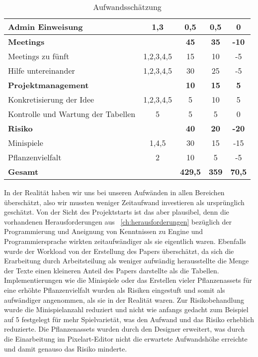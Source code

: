 \begin{table}[H]
\begin{tabular}{|l|c|c|c|c|}
        Admin Einweisung & 1,3 & 0,5 & 0,5 & 0 \\[0.5ex]
        \hline\hline
        \textbf{Meetings} & & \textbf{45} & \textbf{35} & \textbf{-10} \\
        \hline
        Meetings zu fünft & 1,2,3,4,5 & 15 & 10 & -5 \\
        Hilfe untereinander & 1,2,3,4,5 & 30 & 25 & -5 \\[0.5ex]
        \hline\hline
        \textbf{Projektmanagement} & & \textbf{10} & \textbf{15} & \textbf{5} \\
        \hline
        Konkretisierung der Idee & 1,2,3,4,5 & 5 & 10 & 5 \\
        Kontrolle und Wartung der Tabellen & 5 & 5 & 5 & 0 \\[0.5ex]
        \hline\hline
        \textbf{Risiko} & & \textbf{40} & \textbf{20} & \textbf{-20} \\
        \hline
        Minispiele & 1,4,5 & 30 & 15 & -15 \\
        Pflanzenvielfalt & 2 & 10 & 5 & -5 \\[0.5ex]
        \hline\hline
        \textbf{Gesamt} & & \textbf{429,5} & \textbf{359} & \textbf{70,5} \\
        \hline
    \end{tabular}
    \caption{Aufwandsschätzung}
\end{table}
In der Realität haben wir uns bei unseren Aufwänden in allen Bereichen überschätzt, also wir mussten weniger
Zeitaufwand investieren als ursprünglich geschätzt. 
Von der Sicht des Projektstarts ist das aber plausibel, denn die vorhandenen Herausforderungen aus ~\autoref{ch:herausforderungen} bezüglich der Programmierung und Aneignung von Kenntnissen zu Engine und Programmiersprache
wirkten zeitaufwändiger als sie eigentlich waren.
Ebenfalls wurde der Workload von der Erstellung des Papers überschätzt, da sich die Erarbeitung durch Arbeitsteilung 
als weniger aufwändig herausstellte die Menge der Texte einen kleineren Anteil des Papers darstellte als die Tabellen.
Implementierungen wie die Minispiele oder das Erstellen vieler Pflanzenassets für eine erhöhte Pflanzenvielfalt wurden 
als Risiken eingestuft und somit als aufwändiger angenommen, als sie in der Realität waren. 
Zur Risikobehandlung wurde die Minispielanzahl reduziert und nicht wie anfangs gedacht zum Beispiel auf 5 
festgelegt für mehr Spielvarietät, was den Aufwand und das Risiko erheblich reduzierte.
Die Pflanzenassets wurden durch den Designer erweitert, was durch die Einarbeitung im Pixelart-Editor 
nicht die erwartete Aufwandshöhe erreichte und damit genauso das Risiko minderte.\\ 